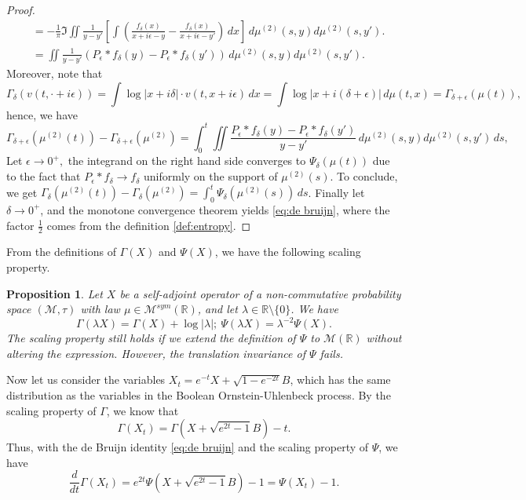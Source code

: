 \documentclass[10pt, reqno]{amsart}
\numberwithin{equation}{section}
\theoremstyle{definition}
\theoremstyle{plain}
\newtheorem{proposition}[definition]{Proposition}
\theoremstyle{remark}
\newcommand{\R}{\mathbb{R}}
\newcommand{\1}{\mathbbm{1}}
\newcommand{\probmr}{\mathcal{M}(\R)}
\begin{document}
\begin{proof}
\begin{align*}
	&= -\frac{1}{\pi}\Im \iint \frac{1}{y-y'}\left[\int \left(\frac{f_\delta(x)}{x+i\epsilon-y} - \frac{f_\delta(x)}{x+i\epsilon-y'} \right)\,dx\right]\,d\mu^{(2)}(s,y)d\mu^{(2)}(s,y').\\
    &=\iint \frac{1}{y-y'}( P_\epsilon\ast f_\delta (y) - P_\epsilon\ast f_\delta (y'))\,d\mu^{(2)}(s,y)d\mu^{(2)}(s,y').
\end{align*}
Moreover, note that $$ \Gamma_\delta(v(t,\cdot+i\epsilon)) = \int \log |x+i\delta|\cdot v(t,x+i\epsilon)\, dx = \int \log |x+i(\delta+\epsilon)|\,d\mu(t,x) = \Gamma_{\delta+\epsilon}(\mu(t)),$$ hence, we have
\begin{equation}
    \Gamma_{\delta+\epsilon}(\mu^{(2)}(t))-\Gamma_{\delta+\epsilon}(\mu^{(2)}) = \int_0^t \iint \frac{P_\epsilon\ast f_\delta (y) - P_\epsilon\ast f_\delta (y')}{y-y'}\,d\mu^{(2)}(s,y)d\mu^{(2)}(s,y')\,ds,
\end{equation}
Let $\epsilon\to 0^+,$ the integrand on the right hand side converges to $\Psi_\delta(\mu(t))$ due to the fact that $P_\epsilon\ast f_\delta\longrightarrow f_\delta$ uniformly on the support of $\mu^{(2)}(s)$. To conclude, we get $\Gamma_\delta(\mu^{(2)}(t)) - \Gamma_\delta(\mu^{(2)}) = \int_0^t \Psi_\delta(\mu^{(2)}(s))\,ds$. Finally let $\delta\to 0^+$, and the monotone convergence theorem yields \eqref{eq:de bruijn}, where the factor $\frac{1}{2}$ comes from the definition \ref{def:entropy}.
\end{proof}

From the definitions of $\Gamma(X)$ and $\Psi(X)$, we have the following scaling property.
\begin{proposition}
    Let $X$ be a self-adjoint operator of a non-commutative probability space $(\mathcal{M},\tau)$ with law $\mu\in\mathcal{M}^{sym}(\R)$, and let $\lambda\in \mathbb{R}\setminus\{0\}$.  
    We have $$\Gamma(\lambda X) = \Gamma(X) + \log |\lambda|;\ \Psi(\lambda X) =\lambda^{-2} \Psi(X).$$
    The scaling property still holds if we extend the definition of $\Psi$ to $\probmr$ without altering the expression. However, the translation invariance of $\Psi$ fails.
\end{proposition}
    Now let us consider the variables $X_t= e^{-t}X+\sqrt{1-e^{-2t}}B$, which has the same distribution as the variables in the Boolean Ornstein-Uhlenbeck process. By the scaling property of $\Gamma$, we know that
	\begin{equation*}
		\Gamma(X_t)=\Gamma\left(X+\sqrt{e^{2t}-1}B\right)-t.
	\end{equation*}
	Thus, with the de Bruijn identity \eqref{eq:de bruijn} and the scaling property of $\Psi$, we have
	\begin{equation}\label{eq:fisher ou}
		\frac{d}{dt}\Gamma(X_t)=e^{2t}\Psi\left(X+\sqrt{e^{2t}-1}B\right)-1= \Psi(X_t)-1.
	\end{equation}
\end{document}
